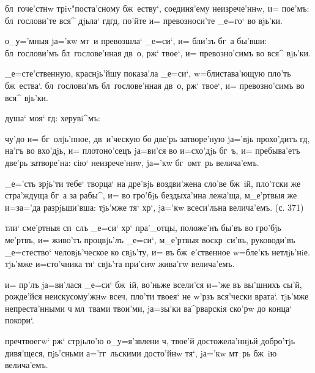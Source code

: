 {{  бл~гоче'стнw трiv"поста'сному 
бж~еству`, соединя'ему неизрече'ннw, и= пое'мъ: 
бл~гослови'те вся^ дjьла` гд гд, по'йте и= 
превозноси'те _е=го` во вjь'ки.


 о_у='мныя jа='кw мт~и превозшла` _е=си`, и= 
бли'зъ бг~а бы'вши: бл~гослови'мъ бл~гослове'нная дв~о, 
рж` твое`, и= превозно'симъ во вся^ вjь'ки.

 _е=сте'ственную, краснjь'йшу показа'ла 
_е=си`, w=блистава'ющую пло'ть бж~ества`. бл~гослови'мъ 
бл~гослове'нная дв~о, рж` твое`, и= превозно'симъ во 
вся^ вjь'ки.

    душа` моя` гд: 
   херувi^мъ:


  чу'до и= бг~олjь'пное, 
дв~и'ческую бо две'рь затворе'ную jа='вjь прохо'дитъ 
гд, на'гъ во вхо'дjь, и= плотоно'сецъ jа=ви'ся во 
и=схо'дjь бг~ъ, и= пребыва'етъ две'рь затворе'на: сiю` 
неизрече'ннw, jа='кw бг~омт~рь велича'емъ.

 _е='сть зрjь'ти тебе` творца` на дре'вjь 
воздви'жена сло'ве бж~iй, пло'тски же стра'ждуща бг~а за 
рабы^, и= во гро'бjь бездыха'нна лежа'ща, м_е'ртвыя же 
и=з\ъ а='да разрjьши'вша: тjь'мже тя` хр`, jа='кw 
всеси'льна велича'емъ. (с. 371)

 тли` сме'ртныя сп~слъ _е=си` хр` 
пра'_отцы, положе'нъ бы'въ во гро'бjь ме'ртвъ, и= живо'тъ 
процвjь'лъ _е=си`, м_е'ртвыя воскр~си'въ, руководи'въ 
_е=стество` человjь'ческое ко свjь'ту, и= въ 
бж~е'ственное w=бле'къ нетлjь'нiе. тjь'мже и=сто'чника 
тя` свjь'та при'снw жива'гw велича'емъ.

  и= пр'лъ jа=ви'лася 
_е=си` бж~iй, во'ньже всели'ся и='же въ вы'шнихъ сы'й, 
рожде'йся неискусому'жнw всеч, пло'ти твоея` не 
w'рзъ вся'чески врата`. тjь'мже непреста'нными ч 
мл~твами твои'ми, jа=зы'ки ва^рварскiя ско'рw до конца` 
покори`.


  преч твоегw` рж` 
стрjьло'ю о_у=я'звлени ч, твое'й достожела'ннjьй 
добро'тjь дивя'щеся, пjь'сньми а='гг~льскими досто'йнw 
тя`, jа='кw мт~рь бж~iю велича'емъ.

}}
